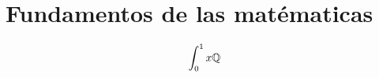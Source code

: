 \chapter{Fundamentos de las matématicas} %
\label{cha:fundamentos-de-las-matematicas}

\[ \int_0^1 x \mathbb{Q}  \]

